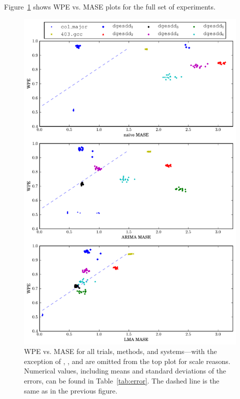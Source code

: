 Figure~\ref{fig:wpe_vs_mase_all} shows WPE vs. MASE plots for the full
set of experiments.
\begin{figure}
  \centering
  \includegraphics[width=\columnwidth]{figs/predictions_vs_entropy3}
\caption{WPE vs. MASE for all trials, methods, and systems---with the
  exception of \svdone, \svdthree, and \svdfive are omitted from the
  top plot for scale reasons.
%
%
Numerical values, including means and standard deviations of the
errors, can be found in Table~\ref{tab:error}.  The dashed line is the
same as in the previous figure.
}
    \label{fig:wpe_vs_mase_all}
\end{figure}
